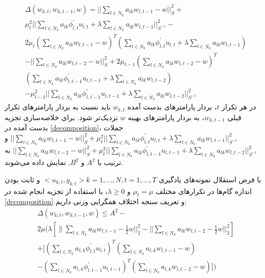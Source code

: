 \begin{equation}\label{decomposition}
	\begin{split}
		&\Delta(w_{k,t},w_{k,t-1},w)=\lvert\lvert\sum_{l\in N_k} a_{lk}w_{l,t-1}-w\rvert\rvert^2_S+\\
		&\mu^2_t \lvert\lvert\sum_{l\in N_k} a_{lk}\phi^{'}_{l,t}u_{l,t}+\lambda \sum_{l\in N_k} a_{lk} w_{l,t-1}\rvert\rvert^2_{S^{-1}}-\\
		&2\mu_t \left(\sum_{l\in N_k} a_{lk}w_{l,t-1}-w\right)^T\left(\sum_{l\in N_k} a_{lk}\phi^{'}_{l,t}u_{l,t}+\lambda \sum_{l\in N_k} a_{lk} w_{l,t-1}\right)\\
		&-\lvert\lvert\sum_{l\in N_k} a_{lk}w_{l,t-2}-w\rvert\rvert^2_S+2\mu_{t-1}\left(\sum_{l\in N_k} a_{lk}w_{l,t-2}-w\right)^T\\
		&\left(\sum_{l\in N_k} a_{lk}\phi^{'}_{l,t-1}u_{l,t-1}+\lambda \sum_{l\in N_k} a_{lk} w_{l,t-2}\right)\\
		&-\mu^2_{t-1}\lvert\lvert\sum_{l\in N_k} a_{lk}\phi^{'}_{l,t-1}u_{l,{t-1}}+\lambda \sum_{l\in N_k} a_{lk} w_{l,t-2}\rvert\rvert^2_{S^{-1}}
	\end{split}
\end{equation}
در هر تکرار $t$، بردار پارامترهای بدست آمده $w_{k,t}$ باید نسبت به بردار پارامترهای تکرار قبلی $w_{k,t-1}$، به بردار پارامترهای بهینه $w$ نزدیک‌تر شود. برای خلاصه‌سازی تجزیه بدست آمده در \ref{decomposition}، جملات $\lvert\lvert\sum_{l\in N_k} a_{lk}w_{l,t-1}-w\rvert\rvert^2_S+\mu^2_t \lvert\lvert\sum_{l\in N_k} a_{lk}\phi^{'}_{l,t}u_{l,t}+\lambda \sum_{l\in N_k} a_{lk} w_{l,t-1}\rvert\rvert^2_{S^{-1}}$ و $||\sum_{l\in N_k} a_{lk}w_{l,t-2}-w||^2_S+\mu^2_t||\sum_{l\in N_k} a_{lk}\phi^{'}_{l,t-1}u_{l,{t-1}}+\lambda \sum_{l\in N_k} a_{lk} w_{l,t-2}||^2_{S^{-1}}$ به ترتیب با $A^2$ و $B^2$, نمایش داده می‌شوند. 
\begin{theorem}
	با فرض استقلال نمونه‌های یادگیری $<u_{k,t},y_{k,t}>k=1,...,N, t=1,...,T$ و ثابت بودن اندازه گام‌ها در تکرارهای مختلف $\mu_{t}=\mu$ و $\lambda\ge0$، با استفاده از تجزیه انجام شده در \ref{decomposition} و تعریف سنجه اختلاف همگرایی وزنی داریم:
	\begin{equation}\label{inequality}
		\begin{split}
			&\Delta(w_{k,t},w_{k,t-1},w)\leq A^2-\\
			&2\mu (\lambda \left[\lVert\sum_{l\in N_k} a_{lk}w_{l,t-1}-\frac{1}{2}w\rvert\rvert^2_2-\lvert\lvert\sum_{l\in N_k} a_{lk}w_{l,t-2}-\frac{1}{2}w\rvert\rvert^2_2\right]\\
			&+[\left(\sum_{l\in N_k}a_{l,k}\phi^{'}_{l,t}u_{l,t}\right)^T\left(\sum_{l\in N_k}a_{l,k}w_{l,t-1}-w\right)\\
			&-\left(\sum_{l\in N_k}a_{l,k}\phi^{'}_{l,t-1}u_{l,t-1}\right)^T\left(\sum_{l\in N_k}a_{l,k}w_{l,t-2}-w\right)])
		\end{split}
	\end{equation}
	
\end{theorem}

